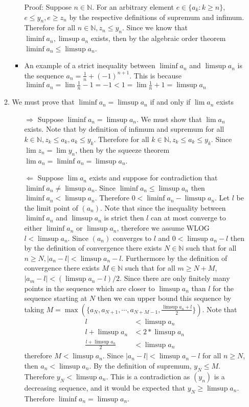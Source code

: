 \documentclass[12pt, letterpaper]{article}
\newcommand{\N}{\mathbb{N}}
\begin{document}
\begin{enumerate}
\begin{enumerate}
\begin{itemize}
				Proof:  Suppose $n \in \N$. For an arbitrary element $e \in \{a_k : k \geq n\}$, $e \leq y_n, e \geq z_n$ by the respective definitions of supremum and infimum.  Therefore for all $n \in \N, z_n \leq y_n$.  Since we know that $\liminf a_n, \limsup a_n$ exists, then by the algebraic order theorem $\liminf a_n \leq \limsup a_n$.
				\item An example of a strict inequality between $\liminf a_n$ and $\limsup a_n$ is the sequence $a_n = \frac{1}{n} + (-1)^{n+1}$.  
				This is because $\liminf a_n = \lim \frac{1}{n} - 1 = -1 < 1 = \lim \frac{1}{n} + 1 = \limsup a_n$
			\end{itemize}
			\item We must prove that $\liminf a_n = \limsup a_n$ if and only if $\lim a_n$ exists
			\begin{itemize}
				\item[$\Rightarrow$] Suppose $\liminf a_n = \limsup a_n$.  We must show that $\lim a_n$ exists.  Note that by definition of infimum and supremum for all $k \in \N, z_k \leq a_k, a_k \leq y_k$.  Therefore for all $k \in \N, z_k \leq a_k \leq y_k$.  Since $\lim z_n = \lim y_n$, then by the squeeze theorem $\lim a_n = \liminf a_n = \limsup a_n$.
				\item[$\Leftarrow$] Suppose $\lim a_n$ exists and suppose for contradiction that $\liminf a_n \neq \limsup a_n$.  
				Since $\liminf a_n \leq \limsup a_n$ then $\liminf a_n < \limsup a_n$.  Therefore $0 < \liminf a_n - \limsup a_n$.  Let $l$ be the limit point of $(a_n)$.  Note that since the inequality between $\liminf a_n$ and $\limsup a_n$ is
				strict then $l$ can at most converge to either $\liminf a_n$ or 
				$\limsup a_n$, therefore we assume WLOG $l < \limsup a_n$.
				Since $(a_n)$ converges to $l$ and $0 < \limsup a_n - l$ then 
				by the definition of convergence there exists $N\in \N$ such that 
				for all $n \geq N, |a_n - l| < \limsup a_n - l$.  Furthermore by 
				the definition of convergence there exists $M \in \N$ such that 
				for all $m \geq N + M$, $|a_m - l| < (\limsup a_n - l)/2$.  Since
				there are only finitely many points in the sequence which are
				closer to $\limsup a_n$ than $l$ for the sequence starting at $N$ 
				then we can upper bound this sequence by taking 
				$M = \max(\{a_N, a_{N+1}, \cdots, a_{N+M-1}, \frac{\limsup a_n + l}{2}\})$.  
				Note that 
				\begin{align*}
					l &< \limsup a_n\\
					l + \limsup a_n &< 2 * \limsup a_n\\
					\frac{l + \limsup a_n}{2} &< \limsup a_n
				\end{align*}
				therefore $M < \limsup a_n$.
				Since $|a_n - l| < \limsup a_n -l$ for all $n \geq N$, then $a_n < \limsup a_n$.  By the definition of supremum, $y_N \leq M$.  Therefore $y_N < \limsup a_n$.  This is a contradiction as $(y_n)$ is a decreasing sequence, and it would be expected that $y_N \geq \limsup a_n$.  Therefore $\liminf a_n = \limsup a_n$.  
			\end{itemize}
		\end{enumerate}
	\end{enumerate}
\end{document}
